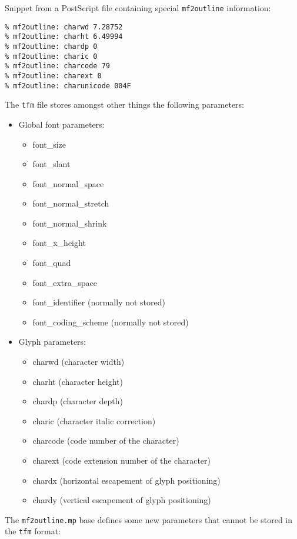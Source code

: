 \documentclass{scrartcl}
\begin{document}
Snippet from a PostScript file containing special \texttt{mf2outline} information:\lstset{language=PostScript,columns=fullflexible}
\begin{lstlisting}
% mf2outline: charwd 7.28752
% mf2outline: charht 6.49994
% mf2outline: chardp 0
% mf2outline: charic 0
% mf2outline: charcode 79
% mf2outline: charext 0
% mf2outline: charunicode 004F
\end{lstlisting}
%
The \texttt{tfm} file stores amongst other things the following parameters:
\begin{itemize}
	\item Global font parameters:
	\begin{itemize}
		\item font\_size
		\item font\_slant
		\item font\_normal\_space
		\item font\_normal\_stretch
		\item font\_normal\_shrink
		\item font\_x\_height
		\item font\_quad
		\item font\_extra\_space
		\item font\_identifier (normally not stored)
		\item font\_coding\_scheme (normally not stored)
	\end{itemize}
	\item Glyph parameters:
	\begin{itemize}
		\item charwd (character width)
		\item charht (character height)
		\item chardp (character depth)
		\item charic (character italic correction)
		\item charcode (code number of the character)
		\item charext (code extension number of the character)
		\item chardx (horizontal escapement of glyph positioning)
		\item chardy (vertical escapement of glyph positioning)
	\end{itemize}
\end{itemize}
The \texttt{mf2outline.mp} base defines some new parameters that cannot be stored in the \texttt{tfm} format:
\end{document}
